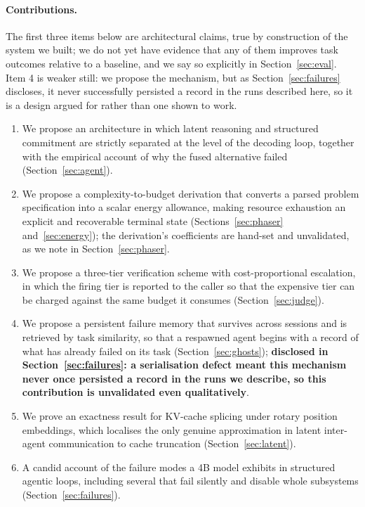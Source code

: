 \documentclass[11pt]{article}
\begin{document}
\paragraph{Contributions.} The first three items below are architectural
claims, true by construction of the system we built; we do not yet have
evidence that any of them improves task outcomes relative to a baseline, and
we say so explicitly in Section~\ref{sec:eval}. Item 4 is weaker still: we
propose the mechanism, but as Section~\ref{sec:failures} discloses, it never
successfully persisted a record in the runs described here, so it is a design
argued for rather than one shown to work.
\begin{enumerate}
\item We propose an architecture in which latent reasoning and structured
      commitment are
      strictly separated at the level of the decoding loop, together with the
      empirical account of why the fused alternative failed
      (Section~\ref{sec:agent}).
\item We propose a complexity-to-budget derivation that converts a parsed
      problem specification into a scalar energy allowance, making resource
      exhaustion an explicit and recoverable terminal state (Sections~\ref{sec:phaser}
      and~\ref{sec:energy}); the derivation's coefficients are hand-set and
      unvalidated, as we note in Section~\ref{sec:phaser}.
\item We propose a three-tier verification scheme with cost-proportional
      escalation, in which the firing tier is reported to the caller so that
      the expensive tier can be charged against the same budget it consumes
      (Section~\ref{sec:judge}).
\item We propose a persistent failure memory that survives across sessions and
      is retrieved by task similarity, so that a respawned agent begins with a
      record of what has already failed on its task (Section~\ref{sec:ghosts});
      \textbf{disclosed in Section~\ref{sec:failures}: a serialisation defect
      meant this mechanism never once persisted a record in the runs we
      describe, so this contribution is unvalidated even qualitatively}.
\item We prove an exactness result for KV-cache splicing under rotary position
      embeddings, which localises the only genuine approximation in latent
      inter-agent communication to cache truncation
      (Section~\ref{sec:latent}).
\item A candid account of the failure modes a 4B model exhibits in structured
      agentic loops, including several that fail silently and disable whole
      subsystems (Section~\ref{sec:failures}).
\end{enumerate}
\end{document}
